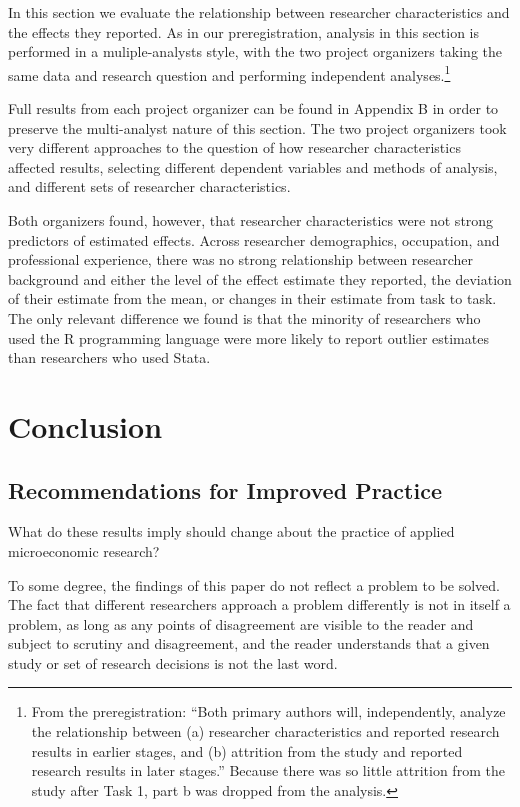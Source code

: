 \documentclass[
  letterpaper,
  DIV=11,
  numbers=noendperiod]{scrartcl}
\begin{document}
In this section we evaluate the relationship between researcher
characteristics and the effects they reported. As in our
preregistration, analysis in this section is performed in a
muliple-analysts style, with the two project organizers taking the same
data and research question and performing independent
analyses.\footnote{From the preregistration: ``Both primary authors
  will, independently, analyze the relationship between (a) researcher
  characteristics and reported research results in earlier stages, and
  (b) attrition from the study and reported research results in later
  stages.'' Because there was so little attrition from the study after
  Task 1, part b was dropped from the analysis.}

Full results from each project organizer can be found in Appendix B in
order to preserve the multi-analyst nature of this section. The two
project organizers took very different approaches to the question of how
researcher characteristics affected results, selecting different
dependent variables and methods of analysis, and different sets of
researcher characteristics.

Both organizers found, however, that researcher characteristics were not
strong predictors of estimated effects. Across researcher demographics,
occupation, and professional experience, there was no strong
relationship between researcher background and either the level of the
effect estimate they reported, the deviation of their estimate from the
mean, or changes in their estimate from task to task. The only relevant
difference we found is that the minority of researchers who used the R
programming language were more likely to report outlier estimates than
researchers who used Stata.

\hypertarget{conclusion}{%
\section{Conclusion}\label{conclusion}}

\hypertarget{recommendations-for-improved-practice}{%
\subsection{Recommendations for Improved
Practice}\label{recommendations-for-improved-practice}}

What do these results imply should change about the practice of applied
microeconomic research?

To some degree, the findings of this paper do not reflect a problem to
be solved. The fact that different researchers approach a problem
differently is not in itself a problem, as long as any points of
disagreement are visible to the reader and subject to scrutiny and
disagreement, and the reader understands that a given study or set of
research decisions is not the last word.
\end{document}
